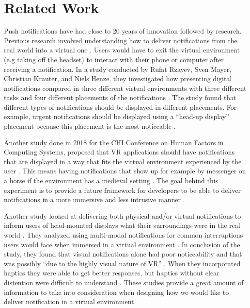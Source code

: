 \documentclass[acmlarge]{acmart}
\begin{document}
\section{Related Work}

Push notifications have had close to 20 years of innovation followed by research.  Previous research involved understanding how to deliver notifications from the real world into a virtual one \citet{Rzayev19}. Users would have to exit the virtual environment (e.g taking off the headset) to interact with their phone or computer after receiving a notification. In a study conducted by Rufat Rzayev, Sven Mayer, Christian Krauter, and Niels Henze, they investigated how presenting digital notifications compared in three different virtual environments with three different tasks and  four different placements of the notifications \citet{Rzayev19}. The study found that different types of notifications should be displayed in different placements. For example, urgent notifications should be displayed using a “head-up display” placement because this placement is the most noticeable \citet{Rzayev19}. 

Another study done in 2018 for the CHI Conference on Human Factors in Computing Systems, proposed that VR applications should have notifications that are displayed in a way that fits the virtual environment experienced by the user \citet{Zenner18}. This means having notifications that show up for example by messenger on a horse if the environment has a medieval setting \citet{Zenner18}. The goal behind this experiment is to provide a future framework for developers to be able to  deliver notifications in a more immersive and less intrusive manner \citet{Zenner18}. 

Another study looked at delivering both physical and/or virtual notifications to inform users of head-mounted displays what their surroundings were in the real world \citet{Ghosh18}. They analyzed using multi-modal notifications for common interruptions users would face when immersed in a virtual environment \citet{Ghosh18}. In conclusion of the study, they found that visual notifications alone had poor noticeability and that was possibly “due to the highly visual nature of VR” \citet{Ghosh18}. When they incorporated haptics they were able to get better responses, but haptics without clear distention were difficult to understand \citet{Ghosh18}. These studies provide a great amount of information to take into consideration when designing how we would like to deliver notification in a virtual environment. 
\end{document}
